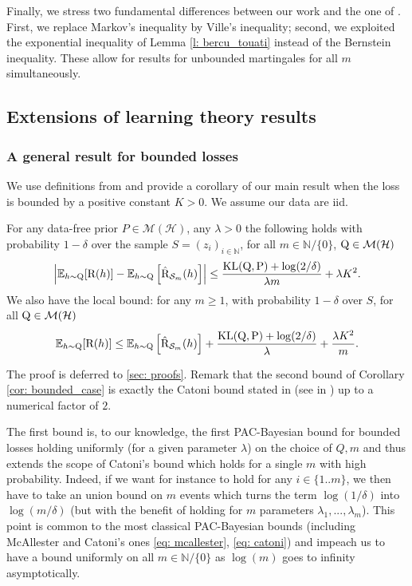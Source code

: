 \begin{noaddcontents}
Finally, we stress two fundamental differences between our work and the one of \citet{seldin2012bandit}. First, we replace Markov's inequality by Ville's inequality; second, we exploited the exponential inequality of Lemma \ref{l: bercu_touati} instead of the Bernstein inequality. These allow for results for unbounded martingales for all $m$ simultaneously.


\subsection{Extensions of learning theory results}


\subsubsection{A general result for bounded losses}


We use definitions from  and provide a corollary of our main result when the loss is bounded by a positive constant $K>0$. We assume our data are iid.
\begin{corollary}
\label{cor: bounded_case}
For any data-free prior $P\in \mathcal{M}(\mathcal{H})$, any $\lambda>0$ the following holds with probability $1-\delta$ over the sample $S=(z_i)_{i\in\mathbb{N}}$, for all $m\in\mathbb{N}/\{0\}$, $\mathrm{Q}\in\mathcal{M}(\mathcal{H})$
\[ \left | \mathbb{E}_{h\sim \mathrm{Q}} [\text{R}(h)] -  \mathbb{E}_{h\sim \mathrm{Q}} \left[\hat{\text{R}}_{\mathcal{S}_m}(h) \right] \right |  \leq \frac{\operatorname{KL}(\mathrm{Q},\mathrm{P}) +\log(2/\delta)}{\lambda m } + \lambda K^2.  \]
We also have the local bound: for any $m\geq 1$, with probability $1-\delta$ over $S$, for all $\mathrm{Q}\in\mathcal{M}(\mathcal{H})$
\[ \mathbb{E}_{h\sim \mathrm{Q}} [\text{R}(h)] \leq  \mathbb{E}_{h\sim \mathrm{Q}} \left[\hat{\text{R}}_{\mathcal{S}_m}(h) \right] + \frac{\operatorname{KL}(\mathrm{Q},\mathrm{P}) +\log(2/\delta)}{\lambda} + \frac{\lambda K^2}{m}.  \]
\end{corollary}
The proof is deferred to \cref{sec: proofs}. Remark that the second bound of Corollary \ref{cor: bounded_case} is exactly the Catoni bound stated in \citet{alquier2016properties} (see  in ) up to a numerical factor of $2$.


The first bound is, to our knowledge, the first PAC-Bayesian bound for bounded losses holding uniformly (for a given parameter $\lambda$) on the choice of $Q,m$ and thus extends the scope of Catoni's bound which holds for a single $m$ with high probability.  Indeed, if we want for instance  to hold for any $i\in\{1..m\}$, we then have to take an union bound on $m$ events which turns the term $\log(1/\delta)$ into $\log(m/\delta)$ (but with the benefit of holding for $m$ parameters $\lambda_1,...,\lambda_m$). This point is common to the most classical PAC-Bayesian bounds
(including McAllester and Catoni's ones \eqref{eq: mcallester}, \eqref{eq: catoni})
and impeach us to have a bound uniformly on all $m\in\mathbb{N}/\{0\}$ as $\log(m)$ goes to infinity asymptotically.



\end{noaddcontents}
